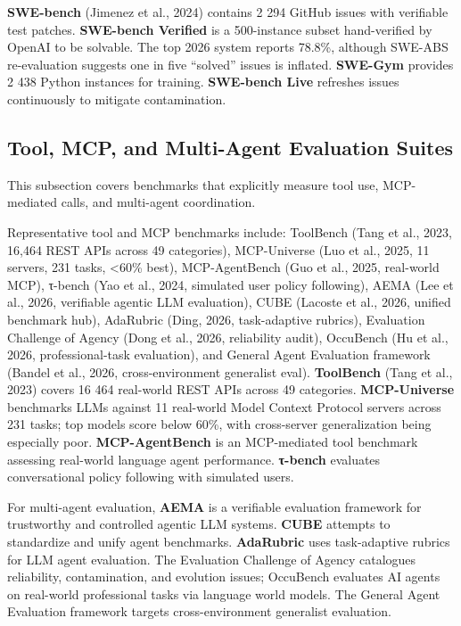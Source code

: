 \documentclass{article}
\begin{document}
\textbf{SWE-bench} (Jimenez et al., 2024) contains 2 294 GitHub issues with verifiable test patches. \textbf{SWE-bench Verified} is a 500-instance subset hand-verified by OpenAI to be solvable. The top 2026 system reports 78.8\%, although SWE-ABS \citep{yu20262026} re-evaluation suggests one in five ``solved'' issues is inflated. \textbf{SWE-Gym} \citep{pan20242024} provides 2 438 Python instances for training. \textbf{SWE-bench Live} \citep{zhang20252025} refreshes issues continuously to mitigate contamination.

\subsection{Tool, MCP, and Multi-Agent Evaluation Suites}\label{tool-mcp-and-multi-agent-evaluation-suites}

This subsection covers benchmarks that explicitly measure tool use, MCP-mediated calls, and multi-agent coordination.

Representative tool and MCP benchmarks include: ToolBench (Tang et al., 2023, 16,464 REST APIs across 49 categories), MCP-Universe (Luo et al., 2025, 11 servers, 231 tasks, \textless60\% best), MCP-AgentBench (Guo et al., 2025, real-world MCP), τ-bench (Yao et al., 2024, simulated user policy following), AEMA (Lee et al., 2026, verifiable agentic LLM evaluation), CUBE (Lacoste et al., 2026, unified benchmark hub), AdaRubric (Ding, 2026, task-adaptive rubrics), Evaluation Challenge of Agency (Dong et al., 2026, reliability audit), OccuBench (Hu et al., 2026, professional-task evaluation), and General Agent Evaluation framework (Bandel et al., 2026, cross-environment generalist eval). \textbf{ToolBench} (Tang et al., 2023) covers 16 464 real-world REST APIs across 49 categories. \textbf{MCP-Universe} \citep{luo20252025} benchmarks LLMs against 11 real-world Model Context Protocol servers across 231 tasks; top models score below 60\%, with cross-server generalization being especially poor. \textbf{MCP-AgentBench} \citep{guo20252025} is an MCP-mediated tool benchmark assessing real-world language agent performance. \textbf{τ-bench} evaluates conversational policy following with simulated users.

For multi-agent evaluation, \textbf{AEMA} \citep{lee20262026} is a verifiable evaluation framework for trustworthy and controlled agentic LLM systems. \textbf{CUBE} \citep{lacoste20262026} attempts to standardize and unify agent benchmarks. \textbf{AdaRubric} \citep{ding2026adarubrictaskadapt} uses task-adaptive rubrics for LLM agent evaluation. The Evaluation Challenge of Agency \citep{dong20262026} catalogues reliability, contamination, and evolution issues; OccuBench \citep{hu20262026} evaluates AI agents on real-world professional tasks via language world models. The General Agent Evaluation framework \citep{bandel20262026} targets cross-environment generalist evaluation.
\end{document}
